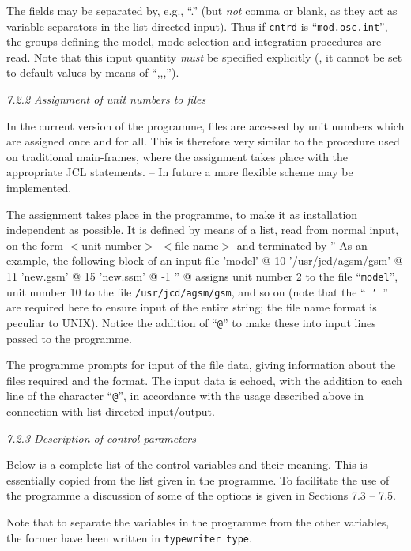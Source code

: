 The fields may be separated by, e.g., ``.'' (but  {\it not} comma
or blank, as they act as variable separators in the
list-directed input).
Thus if {\tt cntrd} is ``{\tt mod.osc.int}'', the groups defining the model,
mode selection and integration procedures are read.
Note that this input quantity {\it must} be specified explicitly
({\ie}, it cannot be set to default values by means of ``,,,'').

\subsect
{\it 7.2.2 Assignment of unit numbers to files} 

In the current version of the programme, files are 
accessed by unit numbers which are assigned once and for all.
This is therefore very similar to the procedure used on
traditional main-frames, where the assignment takes place
with the appropriate JCL statements. -- 
In future a more flexible scheme may be implemented.

The assignment takes place in the programme, to make
it as installation independent as possible.
It is defined by means of a list, read from normal input, on the form
\ms
{
\source
   $<$unit number$>$    $<$file name$>$
}\msni
and terminated by
\ms
{
 ''
}\msni
As an example, the following block of an input file
\ms
{
    'model' \qquad @
  10    '/usr/jcd/agsm/gsm' \qquad @
  11    'new.gsm' \qquad @
  15    'new.ssm' \qquad @
 -1 '' \qquad @
}\msni
assigns unit number 2 to the file ``{\tt model}'', unit number 10 to the
file {\tt /usr/jcd/agsm/gsm}, and so on
(note that the ``{\tt \ '\ }'' are required here
to ensure input of the entire string; the file name format is
peculiar to UNIX).
Notice the addition of ``{\tt @}'' to make these into input lines
passed to the programme.

The programme prompts for input of the file data,
giving information about the files required and the format.
The input data is echoed, with the addition to each line of the
character ``{\tt @}'', in accordance with the usage described
above in connection with list-directed input/output.

\subsect
{\it 7.2.3 Description of control parameters} 

Below is a complete list of the control variables and their meaning.
This is essentially copied from the list given in the programme.
To facilitate the use of the programme a discussion of some of the
options is given in Sections 7.3 -- 7.5.

Note that to separate the variables in the programme from the
other variables, the former have been written in {\tt typewriter type}.

